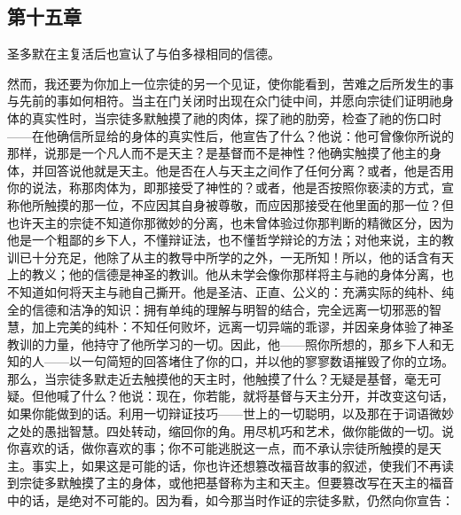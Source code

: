 
\subsection{第十五章}

圣多默在主复活后也宣认了与伯多禄相同的信德。\par

然而，我还要为你加上一位宗徒的另一个见证，使你能看到，苦难之后所发生的事与先前的事如何相符。当主在门关闭时出现在众门徒中间，并愿向宗徒们证明祂身体的真实性时，当宗徒多默触摸了祂的肉体，探了祂的肋旁，检查了祂的伤口时——在他确信所显给的身体的真实性后，他宣告了什么？他说：他可曾像你所说的那样，说那是一个凡人而不是天主？是基督而不是神性？他确实触摸了他主的身体，并回答说他就是天主。他是否在人与天主之间作了任何分离？或者，他是否用你的说法，称那肉体为，即那接受了神性的？或者，他是否按照你亵渎的方式，宣称他所触摸的那一位，不应因其自身被尊敬，而应因那接受在他里面的那一位？但也许天主的宗徒不知道你那微妙的分离，也未曾体验过你那判断的精微区分，因为他是一个粗鄙的乡下人，不懂辩证法，也不懂哲学辩论的方法；对他来说，主的教训已十分充足，他除了从主的教导中所学的之外，一无所知！所以，他的话含有天上的教义；他的信德是神圣的教训。他从未学会像你那样将主与祂的身体分离，也不知道如何将天主与祂自己撕开。他是圣洁、正直、公义的：充满实际的纯朴、纯全的信德和洁净的知识：拥有单纯的理解与明智的结合，完全远离一切邪恶的智慧，加上完美的纯朴：不知任何败坏，远离一切异端的乖谬，并因亲身体验了神圣教训的力量，他持守了他所学习的一切。因此，他——照你所想的，那乡下人和无知的人——以一句简短的回答堵住了你的口，并以他的寥寥数语摧毁了你的立场。那么，当宗徒多默走近去触摸他的天主时，他触摸了什么？无疑是基督，毫无可疑。但他喊了什么？他说：现在，你若能，就将基督与天主分开，并改变这句话，如果你能做到的话。利用一切辩证技巧——世上的一切聪明，以及那在于词语微妙之处的愚拙智慧。四处转动，缩回你的角。用尽机巧和艺术，做你能做的一切。说你喜欢的话，做你喜欢的事；你不可能逃脱这一点，而不承认宗徒所触摸的是天主。事实上，如果这是可能的话，你也许还想篡改福音故事的叙述，使我们不再读到宗徒多默触摸了主的身体，或他把基督称为主和天主。但要篡改写在天主的福音中的话，是绝对不可能的。因为看，如今那当时作证的宗徒多默，仍然向你宣告：\par

